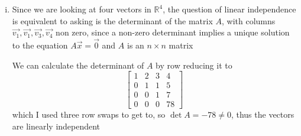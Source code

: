 \documentclass{article}
\begin{document}
\begin{enumerate}[(i)]
    Since the columns of the matrix are linearly independent
    we know there is a unique solution for when \(\vec{y} = \vec{0}\), thus it has a unique solution for all \(\vec{y}\),
    because the matrix is invertible

    Then \(\vec{y}\) could be any vector in \(\mathbb{R}^2\), i.e. the set spans \(\mathbb{R}^3 \)
    \\

    Since the vectors are linearly independent and also span \(\mathbb{R}^3\), 
    they also form a basis for \(\mathbb{R}^3\).

    \item Since we are looking at four vectors in \(\mathbb{R}^4\), the question of linear
    independence is equivalent to asking is the determinant of the matrix \(A\), with columns \(\vec{v_1}, \vec{v_1},
    \vec{v_3}, \vec{v_4}\) non zero, since a non-zero determinant implies a unique solution to the 
    equation \(A\vec{x} = \vec{0}\) and \(A\) is an \(n\times n\) matrix

    We can calculate the determinant of \(A\) by row reducing it to 
    \[
    \begin{bmatrix}
        1&2&3&4 \\ 
        0&1&1&5 \\
        0&0&1&7 \\
        0&0&0&78
    \end{bmatrix}
    \]
    which I used three row swaps to get to, so \(\det{A} = -78 \neq 0\), thus the vectors are linearly independent
    \\


\end{enumerate}
\end{document}
